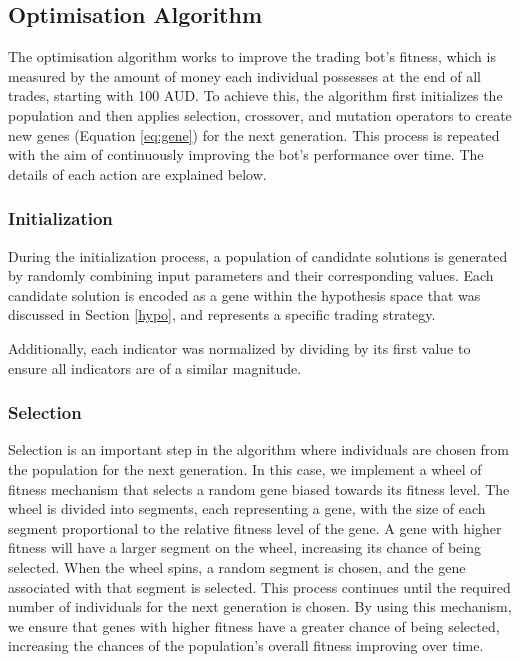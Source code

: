\documentclass{IEEEtran}
\begin{document}
\subsection{Optimisation Algorithm}
The optimisation algorithm works to improve the trading bot's fitness, which is measured by the amount of money each individual possesses at the end of all trades, starting with 100 AUD. To achieve this, the algorithm first initializes the population and then applies selection, crossover, and mutation operators to create new genes (Equation \ref{eq:gene}) for the next generation. This process is repeated with the aim of continuously improving the bot's performance over time. The details of each action are explained below.

\subsubsection{Initialization} 
During the initialization process, a population of candidate solutions is generated by randomly combining input parameters and their corresponding values. Each candidate solution is encoded as a gene within the hypothesis space that was discussed in Section \ref{hypo}, and represents a specific trading strategy.

Additionally, each indicator was normalized by dividing by its first value to ensure all indicators are of a similar magnitude. 

\subsubsection{Selection} 
Selection is an important step in the algorithm where individuals are chosen from the population for the next generation. In this case, we implement a wheel of fitness mechanism that selects a random gene biased towards its fitness level. The wheel is divided into segments, each representing a gene, with the size of each segment proportional to the relative fitness level of the gene. A gene with higher fitness will have a larger segment on the wheel, increasing its chance of being selected. When the wheel spins, a random segment is chosen, and the gene associated with that segment is selected. This process continues until the required number of individuals for the next generation is chosen. By using this mechanism, we ensure that genes with higher fitness have a greater chance of being selected, increasing the chances of the population's overall fitness improving over time.
\end{document}
